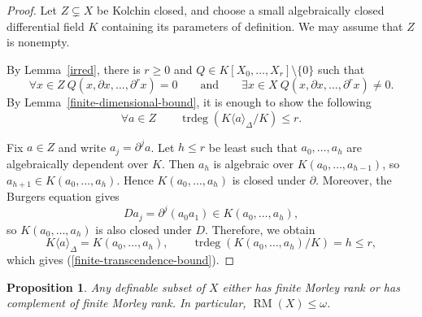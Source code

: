 \documentclass[10pt,a4paper]{amsart}
\newtheorem{proposition}[theorem]{Proposition}
\newcommand{\RM}{\operatorname{RM}}
\newcommand{\trdeg}{\operatorname{trdeg}}
\begin{document}
\begin{proof}
Let $Z\subsetneq X$ be Kolchin closed, and choose a small
algebraically closed differential field $K$ containing
its parameters of definition. We may assume that $Z$ is nonempty.

By Lemma~\ref{irred}, there is $r\geqslant 0$ and $Q\in K[X_0,\ldots,X_r]\setminus \{0\}$ such that
\[
\forall x\in Z \ Q(x,\partial x,\ldots,\partial^r x)=0\qquad \text{and} \qquad \exists x\in X\ Q(x,\partial x,\ldots,\partial^r x)\neq 0.
\]
By Lemma~\ref{finite-dimensional-bound}, it is enough to show the following
\begin{equation}\label{finite-transcendence-bound}
\forall a\in Z\qquad \trdeg(K\langle a\rangle_\Delta/K)\leqslant r.
\tag{$*$}
\end{equation}

Fix $a\in Z$ and write $a_j=\partial^j a$.
Let $h\leqslant r$ be least such that $a_0,\ldots,a_h$
are algebraically dependent over $K$. Then $a_h$ is
algebraic over $K(a_0,\ldots,a_{h-1})$, so $a_{h+1}\in K(a_0,\ldots,a_h)$.
Hence $K(a_0,\ldots,a_h)$ is closed under $\partial$.
Moreover, the Burgers equation gives
\[
Da_j=\partial^j(a_0a_1)\in K(a_0,\ldots,a_h),
\]
so $K(a_0,\ldots,a_h)$ is also closed under $D$. Therefore, we obtain
\[
K\langle a\rangle_\Delta=K(a_0,\ldots,a_h),
\qquad
\trdeg(K(a_0,\ldots,a_h)/K)=h\leqslant r,
\]
which gives (\ref{finite-transcendence-bound}).
\end{proof}

\begin{proposition}\label{upper-bound}
Any definable subset of $X$ either has
finite Morley rank or has complement of finite Morley rank. In particular, $\RM(X)\leqslant\omega$.
\end{proposition}
\end{document}
